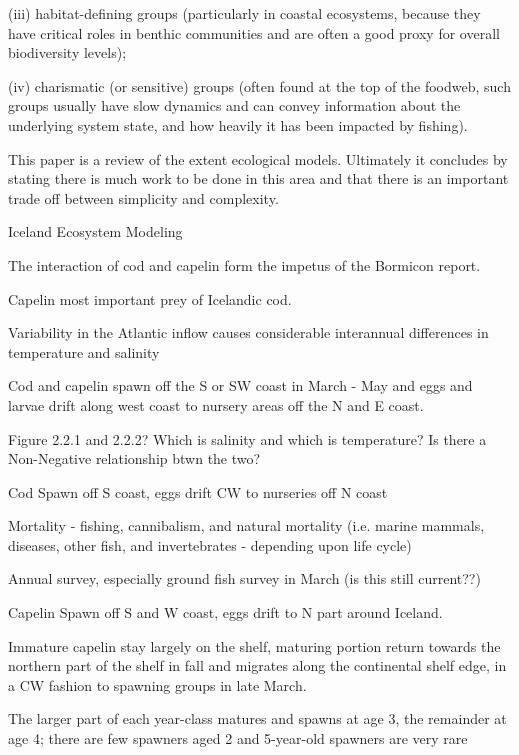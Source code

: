\documentclass{report}
\begin{document}
(iii) habitat-defining groups (particularly in coastal ecosystems, because they have critical roles in
benthic communities and are often a good proxy for overall biodiversity levels);

(iv) charismatic (or sensitive) groups (often found at the top of the foodweb, such groups usually have slow dynamics and can convey information about the underlying system state, and how heavily it has been impacted by fishing).



\cite{fulton2003effect}
This paper is a review of the extent ecological models. Ultimately it concludes by stating there is much work to be done in this area and that there is an important trade off between simplicity and complexity. 


Iceland Ecosystem Modeling

\cite{bormicon}

The interaction of cod and capelin form the impetus of the Bormicon report.

Capelin most important prey of Icelandic cod. 

Variability in the Atlantic inflow causes considerable interannual differences in temperature and salinity

Cod and capelin spawn off the S or SW coast in March - May and eggs and larvae drift along west coast to nursery areas off the N and E coast. 

Figure 2.2.1 and 2.2.2? Which is salinity and which is temperature? Is there a Non-Negative relationship btwn the two?

Cod
Spawn off S coast, eggs drift CW to nurseries off N coast

Mortality - fishing, cannibalism, and natural mortality (i.e. marine mammals, diseases, other fish, and invertebrates - depending upon life cycle)

Annual survey, especially ground fish survey in March (is this still current??)

Capelin
 Spawn off S and W coast, eggs drift to N part around Iceland.

Immature capelin stay largely on the shelf, maturing portion return towards the northern part of the shelf in fall and migrates along the continental shelf edge, in a CW fashion to spawning groups in late March.

The larger part of each year-class matures and spawns at age 3, the remainder at age 4; there are few spawners aged 2 and 5-year-old spawners are very rare
\end{document}
